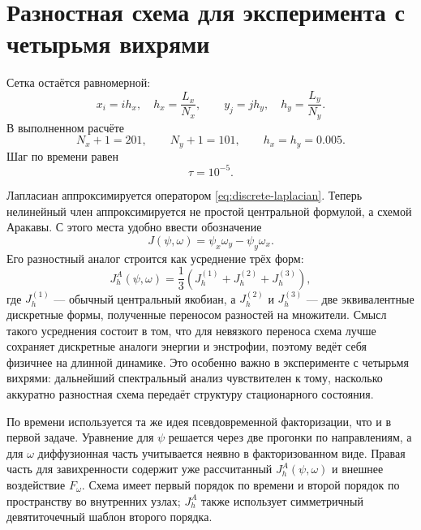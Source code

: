 \documentclass[12pt,a4paper]{article}
\begin{document}
\section{Разностная схема для эксперимента с четырьмя вихрями}

Сетка остаётся равномерной:
\[
    x_i=ih_x,\quad h_x=\frac{L_x}{N_x},
    \qquad
    y_j=jh_y,\quad h_y=\frac{L_y}{N_y}.
\]
В выполненном расчёте
\begin{equation}
    N_x+1=201,\qquad N_y+1=101,\qquad
    h_x=h_y=0.005.
    \label{eq:second-grid-size}
\end{equation}
Шаг по времени равен
\begin{equation}
    \tau=10^{-5}.
    \label{eq:second-dt}
\end{equation}

Лапласиан аппроксимируется оператором \eqref{eq:discrete-laplacian}.
Теперь нелинейный член аппроксимируется не простой центральной формулой, а схемой Аракавы.
С этого места удобно ввести обозначение
\begin{equation}
    J(\psi,\omega)
    =
    \psi_x\omega_y-\psi_y\omega_x.
    \label{eq:jacobian-definition}
\end{equation}
Его разностный аналог строится как усреднение трёх форм:
\begin{equation}
    J_h^A(\psi,\omega)
    =
    \frac13\left(J_h^{(1)}+J_h^{(2)}+J_h^{(3)}\right),
    \label{eq:arakawa}
\end{equation}
где \(J_h^{(1)}\) --- обычный центральный якобиан, а \(J_h^{(2)}\) и \(J_h^{(3)}\) --- две эквивалентные дискретные формы, полученные переносом разностей на множители.
Смысл такого усреднения состоит в том, что для невязкого переноса схема лучше сохраняет дискретные аналоги энергии и энстрофии, поэтому ведёт себя физичнее на длинной динамике.
Это особенно важно в эксперименте с четырьмя вихрями: дальнейший спектральный анализ чувствителен к тому, насколько аккуратно разностная схема передаёт структуру стационарного состояния.

По времени используется та же идея псевдовременной факторизации, что и в первой задаче.
Уравнение для \(\psi\) решается через две прогонки по направлениям, а для \(\omega\) диффузионная часть учитывается неявно в факторизованном виде.
Правая часть для завихренности содержит уже рассчитанный \(J_h^A(\psi,\omega)\) и внешнее воздействие \(F_\omega\).
Схема имеет первый порядок по времени и второй порядок по пространству во внутренних узлах; \(J_h^A\) также использует симметричный девятиточечный шаблон второго порядка.
\end{document}
